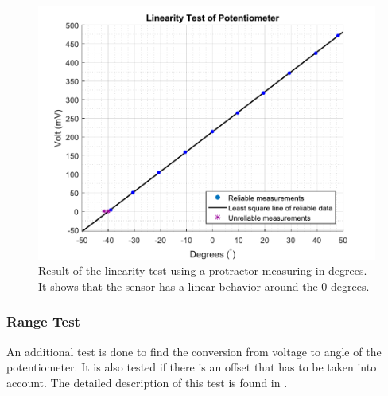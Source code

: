 \begin{figure}[H] 
	\centering 
	\includegraphics[scale=0.6]{figures/linearityOfPotmeterTest2-1}
	\caption{Result of the linearity test using a protractor measuring in degrees. It shows that the sensor has a linear behavior around the 0 degrees.}
	\label{linearityOfPotmeterTest}
\end{figure}


\subsubsection{Range Test}
An additional test is done to find the conversion from voltage to angle of the potentiometer. It is also tested if there is an offset that has to be taken into account. The detailed description of this test is found in .

